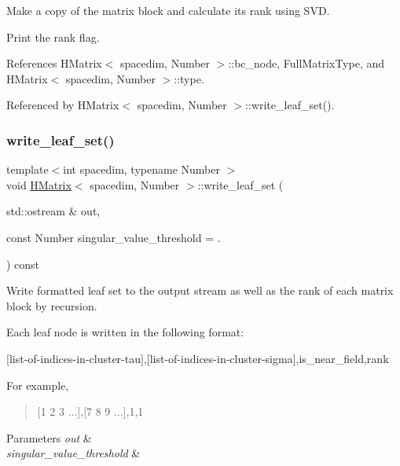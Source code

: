 Make a copy of the matrix block and calculate its rank using S\+VD.

Print the {\ttfamily rank} flag.

References H\+Matrix$<$ spacedim, Number $>$\+::bc\+\_\+node, Full\+Matrix\+Type, and H\+Matrix$<$ spacedim, Number $>$\+::type.



Referenced by H\+Matrix$<$ spacedim, Number $>$\+::write\+\_\+leaf\+\_\+set().

\mbox{\label{classHMatrix_aaf0ae0960a40ad78a941aee823e80315}} 
\subsubsection{\texorpdfstring{write\+\_\+leaf\+\_\+set()}{write\_leaf\_set()}}
{\footnotesize\ttfamily template$<$int spacedim, typename Number $>$ \\
void \hyperlink{classHMatrix}{H\+Matrix}$<$ spacedim, Number $>$\+::write\+\_\+leaf\+\_\+set (\begin{DoxyParamCaption}\item[{std\+::ostream \&}]{out,  }\item[{const Number}]{singular\+\_\+value\+\_\+threshold = {.} }\end{DoxyParamCaption}) const}

Write formatted leaf set to the output stream as well as the rank of each matrix block by recursion.

Each leaf node is written in the following format\+:

\begin{quote}


\end{quote}
\mbox{[}list-\/of-\/indices-\/in-\/cluster-\/tau\mbox{]},\mbox{[}list-\/of-\/indices-\/in-\/cluster-\/sigma\mbox{]},is\+\_\+near\+\_\+field,rank

For example,

\begin{quote}
\mbox{[}1 2 3 ...\mbox{]},\mbox{[}7 8 9 ...\mbox{]},1,1 \end{quote}

\begin{DoxyParams}{Parameters}
{\em out} & \\
\hline
{\em singular\+\_\+value\+\_\+threshold} & \\
\hline
\end{DoxyParams}


